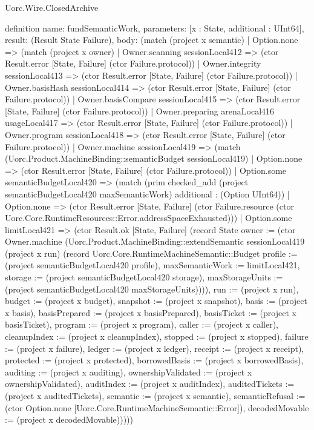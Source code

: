 \begin{lexlean}{Uorc.Wire.ClosedArchive}
\begin{semanticmodule}
definition{
  name: fundSemanticWork,
  parameters: [x : State, additional : UInt64],
  result: (Result State Failure),
  body: (match (project x semantic)
    | Option.none => (match (project x owner)
      | Owner.scanning sessionLocal412 => (ctor Result.error [State, Failure] (ctor Failure.protocol))
      | Owner.integrity sessionLocal413 => (ctor Result.error [State, Failure] (ctor Failure.protocol))
      | Owner.basisHash sessionLocal414 => (ctor Result.error [State, Failure] (ctor Failure.protocol))
      | Owner.basisCompare sessionLocal415 => (ctor Result.error [State, Failure] (ctor Failure.protocol))
      | Owner.preparing arenaLocal416 usageLocal417 => (ctor Result.error [State, Failure] (ctor Failure.protocol))
      | Owner.program sessionLocal418 => (ctor Result.error [State, Failure] (ctor Failure.protocol))
      | Owner.machine sessionLocal419 => (match (Uorc.Product.MachineBinding::semanticBudget sessionLocal419)
        | Option.none => (ctor Result.error [State, Failure] (ctor Failure.protocol))
        | Option.some semanticBudgetLocal420 => (match (prim checked_add (project semanticBudgetLocal420 maxSemanticWork) additional : (Option UInt64))
          | Option.none => (ctor Result.error [State, Failure] (ctor Failure.resource (ctor Uorc.Core.RuntimeResources::Error.addressSpaceExhausted)))
          | Option.some limitLocal421 => (ctor Result.ok [State, Failure] (record State {owner := (ctor Owner.machine (Uorc.Product.MachineBinding::extendSemantic sessionLocal419 (project x run) (record Uorc.Core.RuntimeMachineSemantic::Budget {profile := (project semanticBudgetLocal420 profile), maxSemanticWork := limitLocal421, storage := (project semanticBudgetLocal420 storage), maxStorageUnits := (project semanticBudgetLocal420 maxStorageUnits)}))), run := (project x run), budget := (project x budget), snapshot := (project x snapshot), basis := (project x basis), basisPrepared := (project x basisPrepared), basisTicket := (project x basisTicket), program := (project x program), caller := (project x caller), cleanupIndex := (project x cleanupIndex), stopped := (project x stopped), failure := (project x failure), ledger := (project x ledger), receipt := (project x receipt), protected := (project x protected), borrowedBasis := (project x borrowedBasis), auditing := (project x auditing), ownershipValidated := (project x ownershipValidated), auditIndex := (project x auditIndex), auditedTickets := (project x auditedTickets), semantic := (project x semantic), semanticRefusal := (ctor Option.none [Uorc.Core.RuntimeMachineSemantic::Error]), decodedMovable := (project x decodedMovable)}))))
}
\end{semanticmodule}
\end{lexlean}
